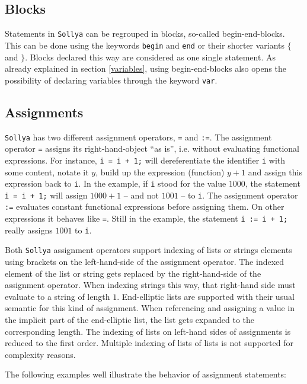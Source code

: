 \documentclass[a4paper]{article}
\newcommand{\key}[1]{\texttt{#1}}
\newcommand{\sollya}{\texttt{Sollya}\xspace}
\begin{document}
\subsection{Blocks}

Statements in \sollya can be regrouped in blocks, so-called
begin-end-blocks.  This can be done using the keywords \key{begin} and
\key{end} or their shorter variants \key{$\lbrace$} and
\key{$\rbrace$}. Blocks declared this way are considered as one single
statement. As already explained in section \ref{variables}, using
begin-end-blocks also opens the possibility of declaring variables
through the keyword \key{var}. 

\subsection{Assignments}

\sollya has two different assignment operators, \texttt{=} and
\texttt{:=}. The assignment operator \texttt{=} assigns its
right-hand-object ``as is'', i.e. without evaluating functional
expressions. For instance, \texttt{i = i + 1;} will dereferentiate the
identifier \texttt{i} with some content, notate it $y$, build up the
expression (function) $y + 1$ and assign this expression back to
\texttt{i}. In the example, if \texttt{i} stood for the value $1000$,
the statement \texttt{i = i + 1;} will assign $1000 + 1$ -- and not
$1001$ -- to \texttt{i}. The assignment operator \texttt{:=} evaluates
constant functional expressions before assigning them. On other
expressions it behaves like \texttt{=}. Still in the example, the
statement \texttt{i := i + 1;} really assigns $1001$ to \texttt{i}.

Both \sollya assignment operators support indexing of lists or strings
elements using brackets on the left-hand-side of the assignment
operator. The indexed element of the list or string gets replaced by
the right-hand-side of the assignment operator.  When indexing strings
this way, that right-hand side must evaluate to a string of length
$1$. End-elliptic lists are supported with their usual semantic for
this kind of assignment.  When referencing and assigning a value in
the implicit part of the end-elliptic list, the list gets expanded to
the corresponding length. The indexing of lists on left-hand sides of
assignments is reduced to the first order. Multiple indexing of lists
of lists is not supported for complexity reasons. 

The following examples well illustrate the behavior of assignment
statements:
\end{document}
